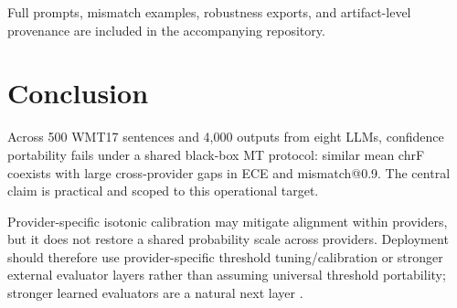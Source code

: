 \documentclass[10pt,conference]{IEEEtran}
\begin{document}
Full prompts, mismatch examples, robustness exports, and artifact-level provenance are included in the accompanying repository.

\section{Conclusion}
Across 500 WMT17 sentences and 4,000 outputs from eight LLMs, confidence portability fails under a shared black-box MT protocol: similar mean chrF coexists with large cross-provider gaps in ECE and mismatch@0.9. The central claim is practical and scoped to this operational target.

Provider-specific isotonic calibration may mitigate alignment within providers, but it does not restore a shared probability scale across providers. Deployment should therefore use provider-specific threshold tuning/calibration or stronger external evaluator layers rather than assuming universal threshold portability; stronger learned evaluators are a natural next layer \citep{kocmi-federmann-2023-large,freitag-etal-2022-results}.



\end{document}
